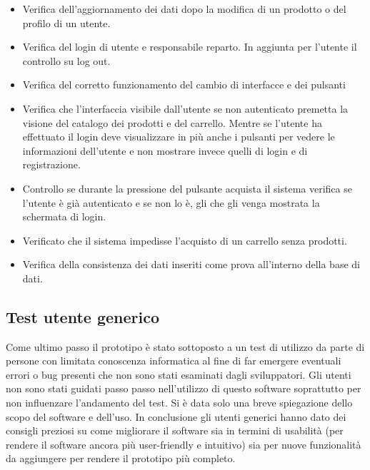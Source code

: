 \documentclass{article}
\begin{document}
\begin{itemize}
    \item Verifica dell'aggiornamento dei dati dopo la modifica di un prodotto o del profilo di un utente.
    \item Verifica del login di utente e responsabile reparto. In aggiunta per l'utente il controllo su log out.
    \item Verifica del corretto funzionamento del cambio di interfacce e dei pulsanti
    \item Verifica che l'interfaccia visibile dall'utente se non autenticato premetta la visione del catalogo dei prodotti e del carrello. Mentre se l'utente ha effettuato il login deve visualizzare in più anche i pulsanti per vedere le informazioni dell'utente e non mostrare invece quelli di login e di registrazione.
    \item Controllo se durante la pressione del pulsante acquista il sistema verifica se l'utente è già autenticato e se non lo è, gli che gli venga mostrata la schermata di login.
    \item Verificato che il sistema impedisse l'acquisto di un carrello senza prodotti.
    \item Verifica della consistenza dei dati inseriti come prova all'interno della base di dati.
\end{itemize}
\subsection{Test utente generico}
Come ultimo passo il prototipo è stato sottoposto a un test di utilizzo da parte di persone con limitata conoscenza informatica al fine di far emergere eventuali errori o bug presenti che non sono stati esaminati dagli sviluppatori. Gli utenti non sono stati guidati passo passo nell'utilizzo di questo software soprattutto per non influenzare l'andamento del test. Si è data solo una breve spiegazione dello scopo del software e dell'uso. In conclusione gli utenti generici hanno dato dei consigli preziosi su come migliorare il software sia in termini di usabilità (per rendere il software ancora più user-friendly e intuitivo) sia per nuove funzionalità da aggiungere per rendere il prototipo più completo.
\end{document}
